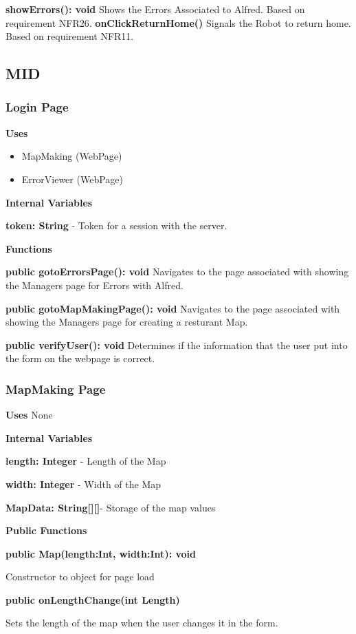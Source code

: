 \documentclass [10pt]{article}
\begin{document}
\textbf{ showErrors(): void}
Shows the Errors Associated to Alfred. Based on requirement NFR26.
\textbf{onClickReturnHome()}
Signals the Robot to return home. Based on requirement NFR11.

\subsection{MID}

\subsubsection{Login Page}
\textbf{Uses}
\begin{itemize}
	\item MapMaking (WebPage)
	\item ErrorViewer (WebPage)
\end{itemize}


\textbf{Internal Variables}

\textbf{token: String} - Token for a session with the server.


\textbf{Functions}

\textbf{public gotoErrorsPage(): void}
Navigates to the page associated with showing the Managers page for Errors with Alfred.

\textbf{public gotoMapMakingPage(): void}
Navigates to the page associated with showing the Managers page for creating a resturant Map.

\textbf{public verifyUser(): void}
Determines if the information that the user put into the form on the webpage is correct.


\subsubsection{MapMaking Page}
\textbf{Uses}
None

\textbf{Internal Variables}

\textbf{length: Integer} - Length of the Map

\textbf{width: Integer} - Width of the Map

\textbf{MapData: String[][]}- Storage of the map values

\textbf{Public Functions}

\textbf{public Map(length:Int, width:Int): void}

Constructor to object for page load

\textbf{public onLengthChange(int Length)}

Sets the length of the map when the user changes it in the form.
\end{document}
